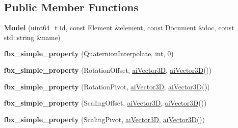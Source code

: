 \subsection*{Public Member Functions}
\begin{DoxyCompactItemize}
\item 
\hypertarget{class_assimp_1_1_f_b_x_1_1_model_ab4b2dbe435683af9a84f05faf123ecc8}{{\bfseries Model} (uint64\+\_\+t id, const \hyperlink{class_assimp_1_1_f_b_x_1_1_element}{Element} \&element, const \hyperlink{class_assimp_1_1_f_b_x_1_1_document}{Document} \&doc, const std\+::string \&name)}\label{class_assimp_1_1_f_b_x_1_1_model_ab4b2dbe435683af9a84f05faf123ecc8}

\item 
\hypertarget{class_assimp_1_1_f_b_x_1_1_model_ab788d7152997948d84443ad122935855}{{\bfseries fbx\+\_\+simple\+\_\+property} (Quaternion\+Interpolate, int, 0)}\label{class_assimp_1_1_f_b_x_1_1_model_ab788d7152997948d84443ad122935855}

\item 
\hypertarget{class_assimp_1_1_f_b_x_1_1_model_a245e8e521077a9e8f0c2925ef836fd49}{{\bfseries fbx\+\_\+simple\+\_\+property} (Rotation\+Offset, \hyperlink{structai_vector3_d}{ai\+Vector3\+D}, \hyperlink{structai_vector3_d}{ai\+Vector3\+D}())}\label{class_assimp_1_1_f_b_x_1_1_model_a245e8e521077a9e8f0c2925ef836fd49}

\item 
\hypertarget{class_assimp_1_1_f_b_x_1_1_model_a5cf497043858836f657c0289b7efd1fe}{{\bfseries fbx\+\_\+simple\+\_\+property} (Rotation\+Pivot, \hyperlink{structai_vector3_d}{ai\+Vector3\+D}, \hyperlink{structai_vector3_d}{ai\+Vector3\+D}())}\label{class_assimp_1_1_f_b_x_1_1_model_a5cf497043858836f657c0289b7efd1fe}

\item 
\hypertarget{class_assimp_1_1_f_b_x_1_1_model_a41582754e8a4284729264679f686d299}{{\bfseries fbx\+\_\+simple\+\_\+property} (Scaling\+Offset, \hyperlink{structai_vector3_d}{ai\+Vector3\+D}, \hyperlink{structai_vector3_d}{ai\+Vector3\+D}())}\label{class_assimp_1_1_f_b_x_1_1_model_a41582754e8a4284729264679f686d299}

\item 
\hypertarget{class_assimp_1_1_f_b_x_1_1_model_aa94a7151d898893bdf78be8ed7d8107b}{{\bfseries fbx\+\_\+simple\+\_\+property} (Scaling\+Pivot, \hyperlink{structai_vector3_d}{ai\+Vector3\+D}, \hyperlink{structai_vector3_d}{ai\+Vector3\+D}())}\label{class_assimp_1_1_f_b_x_1_1_model_aa94a7151d898893bdf78be8ed7d8107b}


\end{DoxyCompactItemize}
